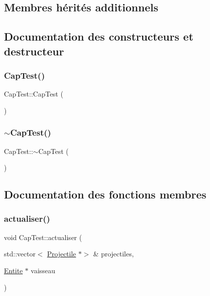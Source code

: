 \subsection*{Membres hérités additionnels}


\subsection{Documentation des constructeurs et destructeur}
\mbox{\label{class_cap_test_a5f6d4b172a6a40f974b3f7414e3f06e5}} 
\subsubsection{\texorpdfstring{Cap\+Test()}{CapTest()}}
{\footnotesize\ttfamily Cap\+Test\+::\+Cap\+Test (\begin{DoxyParamCaption}{ }\end{DoxyParamCaption})}

\mbox{\label{class_cap_test_a92687aa212347d1738e7736cb107d03b}} 
\subsubsection{\texorpdfstring{$\sim$\+Cap\+Test()}{~CapTest()}}
{\footnotesize\ttfamily Cap\+Test\+::$\sim$\+Cap\+Test (\begin{DoxyParamCaption}{ }\end{DoxyParamCaption})}



\subsection{Documentation des fonctions membres}
\mbox{\label{class_cap_test_a5742770894ff765e2785f82aab88b223}} 
\subsubsection{\texorpdfstring{actualiser()}{actualiser()}}
{\footnotesize\ttfamily void Cap\+Test\+::actualiser (\begin{DoxyParamCaption}\item[{std\+::vector$<$ \hyperlink{class_projectile}{Projectile} $\ast$$>$ \&}]{projectiles,  }\item[{\hyperlink{class_entite}{Entite} $\ast$}]{vaisseau }\end{DoxyParamCaption})\hspace{0.3cm}{\ttfamily [virtual]}}



